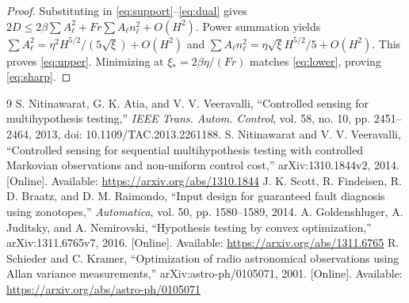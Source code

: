 \documentclass[11pt]{article}
\begin{document}
\begin{proof}
Substituting in \eqref{eq:support}--\eqref{eq:dual} gives
$2D\le2\beta\sum A_\ell^2+Fr\sum A_\ell n_\ell^2+O(H^2)$.
Power summation yields
$\sum A_\ell^2=\eta^2H^{5/2}/(5\sqrt\xi)+O(H^2)$ and
$\sum A_\ell n_\ell^2=\eta\sqrt\xi H^{5/2}/5+O(H^2)$.
This proves \eqref{eq:upper}. Minimizing at
$\xi_*=2\beta\eta/(Fr)$ matches \eqref{eq:lower}, proving \eqref{eq:sharp}.
\end{proof}

\begin{thebibliography}{9}
S. Nitinawarat, G. K. Atia, and V. V. Veeravalli,
``Controlled sensing for multihypothesis testing,''
\emph{IEEE Trans. Autom. Control}, vol. 58, no. 10, pp. 2451--2464, 2013,
doi: 10.1109/TAC.2013.2261188.
S. Nitinawarat and V. V. Veeravalli,
``Controlled sensing for sequential multihypothesis testing with controlled
Markovian observations and non-uniform control cost,''
arXiv:1310.1844v2, 2014. [Online]. Available: \url{https://arxiv.org/abs/1310.1844}
J. K. Scott, R. Findeisen, R. D. Braatz, and D. M. Raimondo,
``Input design for guaranteed fault diagnosis using zonotopes,''
\emph{Automatica}, vol. 50, pp. 1580--1589, 2014.
A. Goldenshluger, A. Juditsky, and A. Nemirovski,
``Hypothesis testing by convex optimization,'' arXiv:1311.6765v7, 2016.
[Online]. Available: \url{https://arxiv.org/abs/1311.6765}
R. Schieder and C. Kramer,
``Optimization of radio astronomical observations using Allan variance measurements,''
arXiv:astro-ph/0105071, 2001.
[Online]. Available: \url{https://arxiv.org/abs/astro-ph/0105071}
\end{thebibliography}
\end{document}
